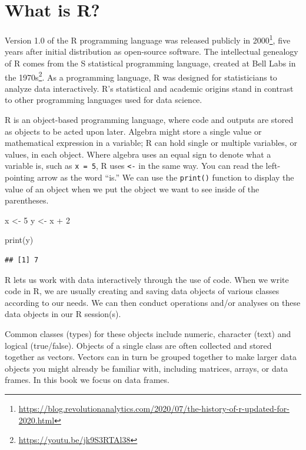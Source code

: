 \documentclass[
  krantz2]{krantz}
\makeatletter
\newenvironment{Shaded}{\begin{snugshade}}{\end{snugshade}}
\newcommand{\DecValTok}[1]{\textcolor[rgb]{0.06,0.06,0.06}{#1}}
\newcommand{\FunctionTok}[1]{\textcolor[rgb]{0,0,0}{#1}}
\newcommand{\NormalTok}[1]{#1}
\newcommand{\OtherTok}[1]{\textcolor[rgb]{0.37,0.37,0.37}{#1}}
\newcommand{\SpecialCharTok}[1]{\textcolor[rgb]{0,0,0}{#1}}
\newenvironment{kframe}{%
\medskip{}
\setlength{\fboxsep}{.8em}
 \def\at@end@of@kframe{}%
 \ifinner\ifhmode%
  \def\at@end@of@kframe{\end{minipage}}%
  \begin{minipage}{\columnwidth}%
 \fi\fi%
 \def\FrameCommand##1{\hskip\@totalleftmargin \hskip-\fboxsep
 \colorbox{shadecolor}{##1}\hskip-\fboxsep
     \hskip-\linewidth \hskip-\@totalleftmargin \hskip\columnwidth}%
 \MakeFramed {\advance\hsize-\width
   \@totalleftmargin\z@ \linewidth\hsize
   \@setminipage}}%
 {\par\unskip\endMakeFramed%
 \at@end@of@kframe}
\renewenvironment{Shaded}{\begin{kframe}}{\end{kframe}}
\makeatother
\begin{document}
\hypertarget{what-is-r}{%
\section{What is R?}\label{what-is-r}}

Version 1.0 of the R programming language was released publicly in 2000\footnote{\url{https://blog.revolutionanalytics.com/2020/07/the-history-of-r-updated-for-2020.html}}, five years after initial distribution as open-source software. The intellectual genealogy of R comes from the S statistical programming language, created at Bell Labs in the 1970s\footnote{\url{https://youtu.be/jk9S3RTAl38}}. As a programming language, R was designed for statisticians to analyze data interactively. R's statistical and academic origins stand in contrast to other programming languages used for data science.

R is an object-based programming language, where code and outputs are stored as objects to be acted upon later. Algebra might store a single value or mathematical expression in a variable; R can hold single or multiple variables, or values, in each object. Where algebra uses an equal sign to denote what a variable is, such as \texttt{x\ =\ 5}, R uses \texttt{\textless{}-} in the same way. You can read the left-pointing arrow as the word ``is.'' We can use the \texttt{print()} function to display the value of an object when we put the object we want to see inside of the parentheses.

\begin{Shaded}
\begin{Highlighting}[]
\NormalTok{x }\OtherTok{\textless{}{-}} \DecValTok{5}
\NormalTok{y }\OtherTok{\textless{}{-}}\NormalTok{ x }\SpecialCharTok{+} \DecValTok{2}

\FunctionTok{print}\NormalTok{(y)}
\end{Highlighting}
\end{Shaded}

\begin{verbatim}
## [1] 7
\end{verbatim}

R lets us work with data interactively through the use of code. When we write code in R, we are usually creating and saving data objects of various classes according to our needs. We can then conduct operations and/or analyses on these data objects in our R session(s).

Common classes (types) for these objects include numeric, character (text) and logical (true/false). Objects of a single class are often collected and stored together as vectors. Vectors can in turn be grouped together to make larger data objects you might already be familiar with, including matrices, arrays, or data frames. In this book we focus on data frames.
\end{document}
